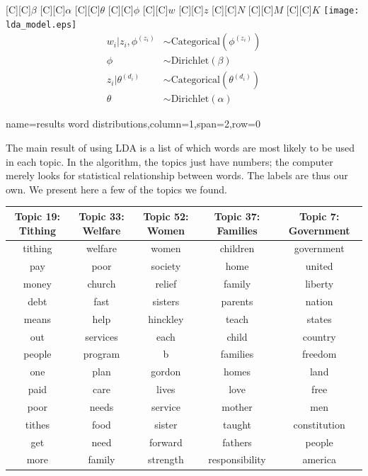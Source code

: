 \documentclass[landscape,final]{baposter}
\begin{document}
\begin{poster}
{	\begin{centering}
	  [C]{\huge$\beta$}
	  [C]{\huge$\alpha$}
	  [C]{\huge$\theta$}
	  [C]{\huge$\phi$}
	  [C]{\huge$w$}
	  [C]{\huge$z$}
	  [C]{\Large$N$}
	  [C]{\Large$M$}
	  [C]{\Large$K$}
	  \texttt{[image: lda\_model.eps]}
	  \begin{align*} 
		w_i|z_i,\phi^{(z_i)} &\sim \mathrm{Categorical}(\phi^{(z_i)}) \\
		\phi &\sim \mathrm{Dirichlet}(\beta) \\
		z_i|\theta^{(d_i)} &\sim \mathrm{Categorical}(\theta^{(d_i)}) \\ 
		\theta &\sim \mathrm{Dirichlet}(\alpha) 
	  \end{align*}
	\end{centering}

  }

  {name=results word distributions,column=1,span=2,row=0}{

	The main result of using LDA is a list of which words are most likely to be
	used in each topic.  In the algorithm, the topics just have numbers; the
	computer merely looks for statistical relationship between words.  The
	labels are thus our own.  We present here a few of the topics we found.

	\small
	\begin{center}
	  \begin{tabular}{ccccc}
		Topic 19: Tithing&Topic 33: Welfare&Topic 52: Women&Topic 37: Families
		&Topic 7: Government\\
		\hline
		tithing&welfare&women&children&government \\
		pay&poor&society&home&united \\
		money&church&relief&family&liberty \\
		debt&fast&sisters&parents&nation \\
		means&help&hinckley&teach&states \\
		out&services&each&child&country \\
		people&program&b&families&freedom \\
		one&plan&gordon&homes&land \\
		paid&care&lives&love&free \\
		poor&needs&service&mother&men \\
		tithes&food&sister&taught&constitution \\
		get&need&forward&fathers&people \\
		more&family&strength&responsibility&america \\
	  \end{tabular}
	\end{center}

}
\end{poster}
\end{document}
